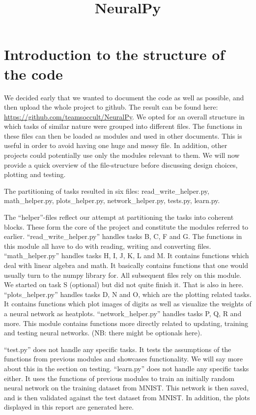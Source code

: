 \documentclass[letterpaper, 12 pt, conference]{ieeeconf}
\title{\LARGE \bf
NeuralPy
}
\begin{document}
\maketitle

\section{Introduction to the structure of the code}

We decided early that we wanted to document the code as well as possible, and then upload the whole project to github. The result can be found here: \url{https://github.com/teamsoccult/NeuralPy}.
We opted for an overall structure in which tasks of similar nature were grouped into different files. The functions in these files can then be loaded as modules and used in other documents. This is useful in order to avoid having one huge and messy file. In addition, other projects could potentially use only the modules relevant to them. We will now provide a quick overview of the file-structure before discussing design choices, plotting and testing.

The partitioning of tasks resulted in six files: 
read\_write\_helper.py, math\_helper.py, plots\_helper.py, network\_helper.py, tests.py, learn.py. 

The “helper”-files reflect our attempt at partitioning the tasks into coherent blocks. These form the core of the project and constitute the modules referred to earlier. 
“read\_write\_helper.py” handles tasks B, C, F and G. The functions in this module all have to do with reading, writing and converting files. 
“math\_helper.py” handles tasks H, I, J, K, L and M. It contains functions which deal with linear algebra and math. It basically contains functions that one would usually turn to the numpy library for. All subsequent files rely on this module.  
We started on task S (optional) but did not quite finish it. That is also in here. 
“plots\_helper.py” handles tasks D, N and O, which are the plotting related tasks. It contains functions which plot images of digits as well as visualize the weights of a neural network as heatplots. 
“network\_helper.py” handles tasks P, Q, R and more. This module contains functions more directly related to updating, training and testing neural networks. (NB: there might be optionals here). 

“test.py” does not handle any specific tasks. It tests the assumptions of the functions from previous modules and showcases functionality. We will say more about this in the section on testing. 
“learn.py” does not handle any specific tasks either. It uses the functions of previous modules to train an initially random neural network on the training dataset from MNIST. This network is then saved, and is then validated against the test dataset from MNIST. 
In addition, the plots displayed in this report are generated here. 
\end{document}
